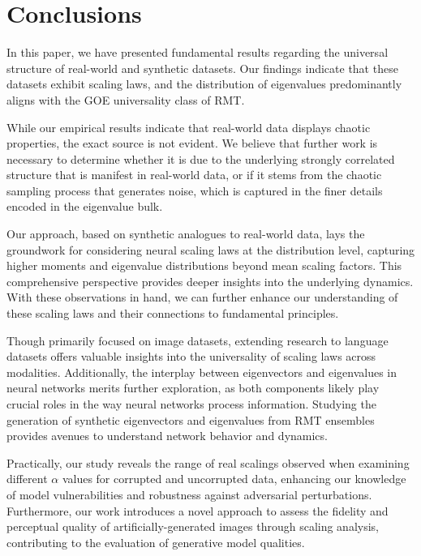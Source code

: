 \documentclass{article}
\begin{document}
\section{Conclusions}
\label{sec:conclusions}
\vspace{-0.2cm}

In this paper, we have presented fundamental results regarding the universal structure of real-world and synthetic datasets. Our findings indicate that these datasets exhibit scaling laws, and the distribution of eigenvalues predominantly aligns with the GOE universality class of RMT.

While our empirical results indicate that real-world data displays chaotic properties, the exact source is not evident. We believe that further work is necessary to determine whether it is due to the underlying strongly correlated structure that is manifest in real-world data, or if it stems from the chaotic sampling process that generates noise, which is captured in the finer details encoded in the eigenvalue bulk.

Our approach, based on synthetic analogues to real-world data, lays the groundwork for considering neural scaling laws at the distribution level, capturing higher moments and eigenvalue distributions beyond mean scaling factors. This comprehensive perspective provides deeper insights into the underlying dynamics. With these observations in hand, we can further enhance our understanding of these scaling laws and their connections to fundamental principles.

Though primarily focused on image datasets, extending research to language datasets offers valuable insights into the universality of scaling laws across modalities. Additionally, the interplay between eigenvectors and eigenvalues in neural networks merits further exploration, as both components likely play crucial roles in the way neural networks process information. Studying the generation of synthetic eigenvectors and eigenvalues from RMT ensembles provides avenues to understand network behavior and dynamics.

Practically, our study reveals the range of real scalings observed when examining different $\alpha$ values for corrupted and uncorrupted data, enhancing our knowledge of model vulnerabilities and robustness against adversarial perturbations. Furthermore, our work introduces a novel approach to assess the fidelity and perceptual quality of artificially-generated images through scaling analysis, contributing to the evaluation of generative model qualities.
\end{document}
